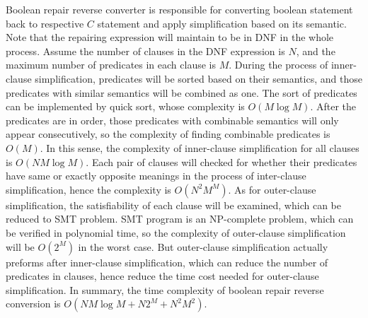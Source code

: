 Boolean repair reverse converter is responsible for converting boolean statement back to respective $C$ statement and apply simplification based on its semantic.
Note that the repairing expression will maintain to be in DNF in the whole process.
Assume the number of clauses in the DNF expression is $N$, and the maximum number of predicates in each clause is $M$.
During the process of inner-clause simplification, predicates will be sorted based on their semantics, and those predicates with similar semantics will be combined as one.
The sort of predicates can be implemented by quick sort, whose complexity is $O(M\log{M})$. After the predicates are in order, those predicates with combinable semantics will only appear consecutively,
so the complexity of finding combinable predicates is $O(M)$.
In this sense, the complexity of inner-clause simplification for all clauses is $O(NM\log{M})$.
Each pair of clauses will checked for whether their predicates have same or exactly opposite meanings in the process of inter-clause simplification, hence the complexity is $O(N^{2}M^{M})$.
As for outer-clause simplification, the satisfiability of each clause will be examined, which can be reduced to SMT problem.
SMT program is an NP-complete problem, which can be verified in polynomial time, so the complexity of outer-clause simplification will be $O(2^{M})$ in the worst case.
But outer-clause simplification actually preforms after inner-clause simplification, which can reduce the number of predicates in clauses, hence reduce the time cost needed for outer-clause simplification.
In summary, the time complexity of boolean repair reverse conversion is $O(NM\log{M} + N2^{M} + N^{2}M^{2})$.
